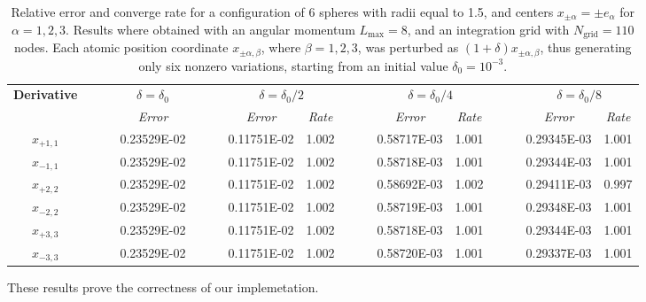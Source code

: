\begin{table}[t]
\footnotesize
\begin{center}
	\begin{tabular}{ @{}cccc  cccc  cccc @{} }
\toprule[0.1em] 
\multirow{2}{*}{\bf Derivative} & $\phantom{abs}$ &  \multicolumn{1}{c}{$\delta = \delta_0$}& $\phantom{abs}$  & \multicolumn{2}{c}{$\delta = \delta_0/2$}& $\phantom{abs}$  & \multicolumn{2}{c}{$\delta = \delta_0/4$}& $\phantom{abs}$  & \multicolumn{2}{c}{$\delta = \delta_0/8$} \\
		         \cmidrule[0.05em]{3-3}  \cmidrule[0.05em](lr){5-6}  \cmidrule[0.05em]{8-9}   \cmidrule[0.05em]{11-12}
&	& {\sl Error}	&& {\sl Error}	& {\sl Rate} && {\sl Error}	& {\sl Rate}&& {\sl Error}	& {\sl Rate} \\
\midrule[0.05em]
$x_{+1,1}$ &  &  0.23529E-02  &  &    0.11751E-02  &  1.002  &&  0.58717E-03  &  1.001  &&  0.29345E-03  &  1.001  \\
$x_ {-1,1}$  &&  0.23529E-02  &   &  0.11751E-02  &  1.002  &&  0.58718E-03  &  1.001  &&  0.29344E-03  &  1.001  \\
$x_ {+2,2}$  &&  0.23529E-02  &   & 0.11751E-02  &  1.002  &&  0.58692E-03  &  1.002  &&  0.29411E-03  &  0.997  \\
$x_ {-2,2}$  &&  0.23529E-02  &    &0.11751E-02  &  1.002  &&  0.58719E-03  &  1.001  &&  0.29348E-03  &  1.001  \\
$x_ {+3,3}$  &&  0.23529E-02  &  &  0.11751E-02  &  1.002  &&  0.58718E-03  &  1.001  &&  0.29344E-03  &  1.001  \\
$x_ {-3,3}$  &&  0.23529E-02  &   &  0.11751E-02  &  1.002  &&  0.58720E-03  &  1.001  &&  0.29337E-03  &  1.001  \\
\bottomrule[0.1em]
\end{tabular}
\caption{Relative error and converge rate for a configuration of 6 spheres with radii equal to 1.5, and centers $x_{\pm \alpha} =  \pm e_\alpha$ for $\alpha = 1, 2,3$.  Results where obtained with an angular momentum $L_\text{max} =  8$, and an integration grid with $N_\text{grid} = 110$ nodes. Each atomic position coordinate $x_{\pm\alpha,\beta}$, where $\beta = 1,2,3$, was perturbed as $(1 + \delta)x_{\pm\alpha , \beta}$, thus generating only six nonzero variations, starting from an initial value $\delta_0 = 10^{-3}$.}\label{tab:1}
\end{center}
\end{table}
These results prove the correctness of our implemetation. 
